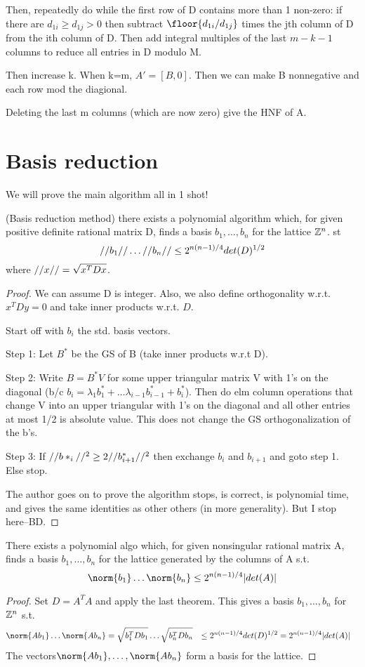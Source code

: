 Then, repeatedly do while the first row of D contains more than 1 non-zero: if there are $d_{1i} \geq d_{1j} > 0$ then subtract $\floor{d_{1i}/d_{1j}}$ times the jth column of D from the ith column of D. Then add integral multiples of the last $m-k-1$ columns  to reduce all entries in D modulo M.

Then increase k. When k=m, $A' = [B, 0]$. Then we can make B nonnegative and each row mod the diagional. 

Deleting the last m columns (which are now zero) give the HNF of A.

\section{Basis reduction}
We will prove the main algorithm all in 1 shot!
\begin{theorem}(Basis reduction method)
there exists a polynomial algorithm which, for given positive definite rational matrix D, finds a basis $b_1, \dots, b_n$ for the lattice $\mathbb Z^n$. st
\[ //b_1//\dots //b_n// \leq 2^{n(n-1)/4} det(D)^{1/2} \]
where $//x// = \sqrt{x^TDx}$.
\end{theorem}
\begin{proof}
We can assume D is integer. Also, we also define orthogonality w.r.t. $x^TDy =0$ and take inner products w.r.t. $D$.

Start off with $b_i$ the std. basis vectors.

Step 1: Let $B^*$ be the GS of B (take inner products w.r.t D).

Step 2: Write $B = B^* V$ for some upper triangular matrix V with 1's on the diagonal (b/c $b_i = \lambda_1 b^*_1 + \dots \lambda_{i-1}b^*_{i-1} + b^*_i$). Then do elm column operations that change V into an upper triangular with 1's on the diagonal and all other entries at most 1/2 is absolute value. This does not change the GS orthogonalization of the b's.

Step 3: If $//b*_i//^2 \geq 2//b^*_{i+1}//^2$ then exchange $b_i$ and $b_{i+1}$ and goto step 1. Else stop.

The author goes on to prove the algorithm stops, is correct, is polynomial time, and gives the same identities as other others (in more generality). But I stop here--BD.
\end{proof}



\begin{corollary}
There exists a polynomial algo which, for given nonsingular rational matrix A, finds a basis $b_1, \dots, b_n$ for the lattice generated by the columns of A s.t. \[\norm{b_1}\dots\norm{b_n} \leq 2^{n(n-1)/4}|det(A)|\]
\end{corollary}
\begin{proof}
Set $D=A^TA$ and apply the last theorem. This gives a basis $b_1, \dots, b_n$ for $\mathbb Z^n$ s.t.
\begin{align*}
\norm{Ab_1}\dots\norm{Ab_n} &= \sqrt{b_1^TDb_1} \dots \sqrt{b_n^TDb_n} 
	& \leq 2^{n(n-1)/4}det(D)^{1/2}
	& = 2^{n(n-1)/4}|det(A)|
\end{align*}
The vectors$\norm{Ab_1}, \dots, \norm{Ab_n}$ form a basis for the lattice.
\end{proof}

